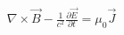 \documentclass[preview]{standalone}
\begin{document}
\begin{align*}
\nabla\times \vec{B} - \frac{1}{c^2}\frac{\partial \vec{E}}{\partial t} = \mu_0 \vec{J}
\end{align*}
\end{document}
